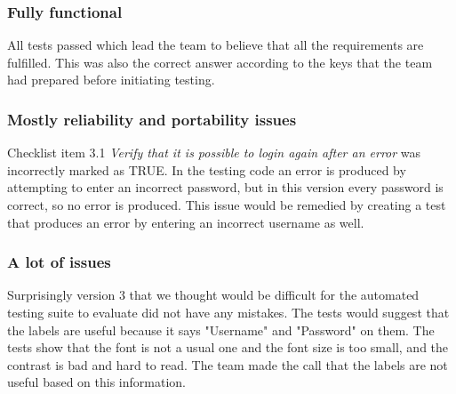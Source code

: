 \documentclass[journal,twocolumn]{IEEEtran}
\begin{document}
\subsubsection{Fully functional}
All tests passed which lead the team to believe that all the requirements are fulfilled. This was also the correct answer according to the keys that the team had prepared before initiating testing.

\subsubsection{Mostly reliability and portability issues}
Checklist item 3.1 \textit{Verify that it is possible to login again after an error} was incorrectly marked as TRUE. In the testing code an error is produced by attempting to enter an incorrect password, but in this version every password is correct, so no error is produced. This issue would be remedied by creating a test that produces an error by entering an incorrect username as well.

\subsubsection{A lot of issues}
Surprisingly version 3 that we thought would be difficult for the automated testing suite to evaluate did not have any mistakes. The tests would suggest that the labels are useful because it says "Username" and "Password" on them. The tests show that the font is not a usual one and the font size is too small, and the contrast is bad and hard to read. The team made the call that the labels are not useful based on this information.

\end{document}
